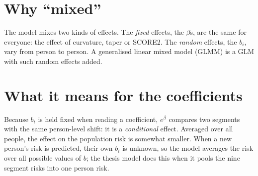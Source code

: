 \documentclass[11pt]{article}
\begin{document}
\section*{Why ``mixed''}

The model mixes two kinds of effects. The \emph{fixed} effects, the $\beta$s,
are the same for everyone: the effect of curvature, taper or SCORE2. The
\emph{random} effects, the $b_i$, vary from person to person. A generalised
linear mixed model (GLMM) is a GLM with such random effects added.

\section*{What it means for the coefficients}

Because $b_i$ is held fixed when reading a coefficient, $e^{\beta}$ compares
two segments with the same person-level shift: it is a \emph{conditional}
effect. Averaged over all people, the effect on the population risk is
somewhat smaller. When a new person's risk is predicted, their own $b_i$ is
unknown, so the model averages the risk over all possible values of $b$;
the thesis model does this when it pools the nine segment risks into one
person risk.
\end{document}
